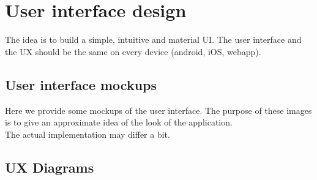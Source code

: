 \documentclass{article}
\begin{document}
\section{User interface design}
\label{sec:UI}
The idea is to build a simple, intuitive and material UI. The user interface and the UX should be the same on every device (android, iOS, webapp).
\subsection{User interface mockups}
Here we provide some mockups of the user interface. The purpose of these images is to give an approximate idea of the look of the application. 
\\ The actual implementation may differ a bit.
\subsection{UX Diagrams}

\newpage
\end{document}
